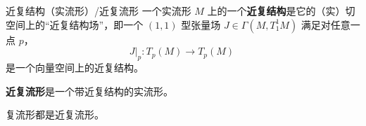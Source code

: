 \begin{definition}{近复结构（实流形）/近复流形}
一个实流形 $M$ 上的一个\textbf{近复结构}是它的（实）切空间上的“近复结构场”，即一个 $(1, 1)$ 型张量场 $J \in \Gamma(M, T_1^1 M)$ 满足对任意一点 $p$， 
$$
J|_p: T_p(M) \to T_p(M)~
$$
是一个向量空间上的近复结构。

\textbf{近复流形}是一个带近复结构的实流形。
\end{definition}

\begin{theorem}{}
复流形都是近复流形。
\end{theorem}





